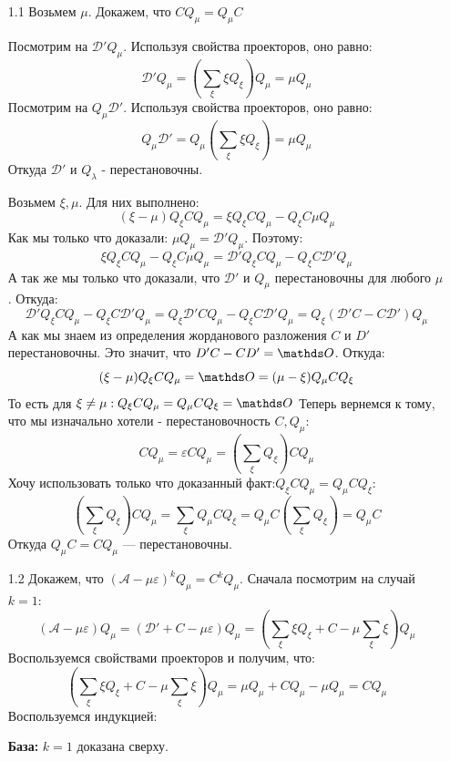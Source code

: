 \begin{enumerate}
    \item[1.1]  Возьмем $ \mu$. Докажем, что $CQ_{\mu}=Q_{\mu}C$
    
    Посмотрим на $\mathcal{D}'Q_{\mu}$. Используя свойства проекторов, оно равно:
    $$\mathcal{D}'Q_{\mu}= \left(\sum\limits_{\xi}\xi Q_\xi\right) Q_{\mu } = \mu Q_{\mu}$$
     Посмотрим на $Q_{\mu}\mathcal{D}'$. Используя свойства проекторов, оно равно:
    $$Q_{\mu}\mathcal{D}'= Q_{\mu }\left(\sum\limits_{\xi}\xi Q_\xi\right)  = \mu Q_{\mu}$$
    Откуда $\mathcal{D}'$ и $Q_{\lambda}$ - перестановочны.

    Возьмем $\xi, \mu$. Для них выполнено:
    $$(\xi-\mu)Q_{\xi} CQ_{\mu} = \xi Q_{\xi}CQ_{\mu}-Q_{\xi}C\mu Q_{\mu}$$
    Как мы только что доказали: $\mu Q_{\mu}=\mathcal{D}'Q_{\mu}$. Поэтому:
    $$\xi Q_{\xi}CQ_{\mu}-Q_{\xi}C\mu Q_{\mu} = \mathcal{D}' Q_{\xi}CQ_{\mu}-Q_{\xi}C\mathcal{D}'Q_{\mu}$$
    А так же мы только что доказали, что $\mathcal{D}'$ и $Q_{\mu}$ перестановочны для любого $\mu$. Откуда:
    $$\mathcal{D}' Q_{\xi}CQ_{\mu}-Q_{\xi}C\mathcal{D}'Q_{\mu} =  Q_{\xi}\mathcal{D}'CQ_{\mu}-Q_{\xi}C\mathcal{D}'Q_{\mu} = Q_{\xi}(\mathcal{D}'C - C\mathcal{D}
    ')Q_{\mu}$$
    А как мы знаем из определения жорданового разложения $C$ и $D'$ перестановочны. Это значит, что $D'C-CD' = \zero$. Откуда:
    $$(\xi-\mu)Q_{\xi} CQ_{\mu} = \zero = (\mu-\xi)Q_{\mu} CQ_{\xi}$$
    То есть для $\xi\neq \mu: Q_{\xi} CQ_{\mu} = Q_{\mu} CQ_{\xi} = \zero$
    Теперь вернемся к тому, что мы изначально хотели - перестановочность $C,Q_{\mu} $:
    $$CQ_{\mu} = \varepsilon C Q_{\mu } = \left(\sum\limits_{\xi}Q_{\xi}\right)CQ_{\mu}$$
    Хочу использовать только что доказанный факт:$Q_{\xi} CQ_{\mu} = Q_{\mu} CQ_{\xi}$:
    $$\left(\sum\limits_{\xi}Q_{\xi}\right)CQ_{\mu}  = \sum\limits_{\xi}Q_{\mu}CQ_{\xi}=Q_{\mu}C \left(\sum\limits_{\xi}Q_{\xi}\right)= Q_{\mu}C$$
    Откуда $Q_{\mu}C = C Q_{\mu}$ --- перестановочны.
    \item[1.2] Докажем, что $(\mathcal{A-\mu\varepsilon})^kQ_{\mu} = C^kQ_{\mu}$.
    Сначала посмотрим на случай $k=1$:
    $$(\mathcal{A-\mu\varepsilon})Q_{\mu} = (\mathcal{D}'+C - \mu \varepsilon)Q_{\mu}=(\sum\limits_{\xi}\xi Q_{\xi} + C  - \mu \sum\limits_{\xi}\xi)Q_{\mu}$$
    Воспользуемся свойствами проекторов и получим, что:
    $$(\sum\limits_{\xi}\xi Q_{\xi} + C  - \mu \sum\limits_{\xi}\xi)Q_{\mu} = \mu Q_{\mu} + C Q_{\mu}- \mu Q_{\mu}= CQ_{\mu}$$
    Воспользуемся индукцией:

    \textbf{База:} $k=1$ доказана сверху.


\end{enumerate}
